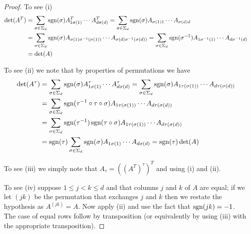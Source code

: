\begin{proof}
To see (i)
\begin{align*}
\det(A^T) &= \sum_{\sigma \in \Sigma_d} \operatorname*{sgn}(\sigma) A^T_{1\sigma(1)} \dotsb A^T_{d \sigma(d)} = \sum_{\sigma \in \Sigma_d} \operatorname*{sgn}(\sigma) A_{\sigma(1) 1} \dotsb A_{\sigma(d) d} \\
&= \sum_{\sigma \in \Sigma_d} \operatorname*{sgn}(\sigma) A_{\sigma(1) \sigma^{-1}(\sigma(1))} \dotsb A_{\sigma(d) \sigma^{-1}(\sigma(d))} 
= \sum_{\sigma \in \Sigma_d} \operatorname*{sgn}(\sigma^{-1}) A_{1 \sigma^{-1}(1)} \dotsb A_{d \sigma^{-1}(d)}  \\
&= \det(A)
\end{align*}
 
To see (ii) we note that by properties of permutations we have
\begin{align*}
\det(A^\tau) &= \sum_{\sigma \in \Sigma_d} \operatorname*{sgn}(\sigma) A^\tau_{1\sigma(1)} \dotsb A^\tau_{d \sigma(d)} 
= \sum_{\sigma \in \Sigma_d} \operatorname*{sgn}(\sigma) A_{1 \tau(\sigma(1))} \dotsb A_{d \tau(\sigma(d))} \\
&= \sum_{\sigma \in \Sigma_d} \operatorname*{sgn}(\tau^{-1} \circ \tau \circ \sigma) A_{1 \tau(\sigma(1))} \dotsb A_{d \tau(\sigma(d))}  \\
&= \sum_{\sigma \in \Sigma_d} \operatorname*{sgn}(\tau^{-1} ) \operatorname*{sgn}( \tau \circ \sigma) A_{1 \tau(\sigma(1))} \dotsb A_{d \tau(\sigma(d))} \\
&= \operatorname*{sgn}(\tau )\sum_{\sigma \in \Sigma_d} \operatorname*{sgn}( \sigma) A_{1 \sigma(1)} \dotsb A_{d \sigma(d)} = \operatorname*{sgn}(\tau) \det(A)
\end{align*}

To see (iii) we simply note that $A_\tau = ((A^T)^\tau)^T$ and using (i) and (ii).

To see (iv) suppose $1 \leq j < k \leq d$ and that columns $j$ and $k$ of $A$ are equal; if we let $(j k)$ be the permutation that exchanges $j$ and $k$ then we restate the hypothesis as $A^{(j k)} = A$.  Now apply (ii) and use the fact that $\operatorname*{sgn}( j k) = -1$.  The case of equal rows follow by transposition (or equivalently by using (iii) with the appropriate transposition).
\end{proof}

